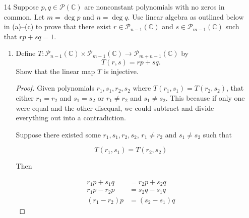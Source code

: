 \begin{enumerate}
    \begin{proof}
        Suppose that we have some $g \in \P(\F)$, $\operatorname{deg} g \ge \operatorname{deg} p$. Then, by the polynomials division algorithm, we have some $q, r \in \P(\F)$ such that 

        \[g = qp + r\]

        Then, $g + U = r + U$. Therefore, all elements of $\P(\F) / U$ are equivalent to a translate of degree less than $\operatorname{deg} p$. Additionally, no polynomials with degree less than $\operatorname{deg} p$ can be reduced down further. Therefore, $\dim \P(\F) / U = \operatorname{dim} p$.

        Such a basis could simply be $1 + U, x + U, \dots, x^{\operatorname{deg} p - 1} + U$.
    \end{proof}

    \item[14] Suppose $p, q \in \mathcal{P}(\mathbb{C})$ are nonconstant polynomials with no zeros in common.
Let $m = \deg p$ and $n = \deg q$. Use linear algebra as outlined below in (a)--(c)
to prove that there exist $r \in \mathcal{P}_{n-1}(\mathbb{C})$ and $s \in \mathcal{P}_{m-1}(\mathbb{C})$ such that
$rp + sq = 1$.
    
    \begin{enumerate}
        \item Define $T \colon \mathcal{P}_{n-1}(\mathbb{C}) \times \mathcal{P}_{m-1}(\mathbb{C}) \to \mathcal{P}_{m+n-1}(\mathbb{C})$ by
        \[
        T(r,s) = rp + sq.
        \]
        Show that the linear map $T$ is injective.

        \begin{proof}
            Given polynomials $r_1, s_1, r_2, s_2$ where $T(r_1, s_1) = T(r_2, s_2)$, that either $r_1 = r_2$ and $s_1 = s_2$ or $r_1 \ne r_2$ and $s_1 \ne s_2$. This because if only one were equal and the other disequal, we could subtract and divide everything out into a contradiction.

            Suppose there existed some $r_1, s_1, r_2, s_2$, $r_1 \ne r_2$ and $s_1 \ne s_2$ such that 

            $$T(r_1, s_1) = T(r_2, s_2)$$

            Then 

            \begin{align}
                r_1p + s_1q &= r_2p + s_2q  \\
                r_1p - r_2p &= s_2q - s_1q \\
                (r_1 - r_2)p &= (s_2 - s_1)q
            \end{align}


\end{proof}
\end{enumerate}
\end{enumerate}
